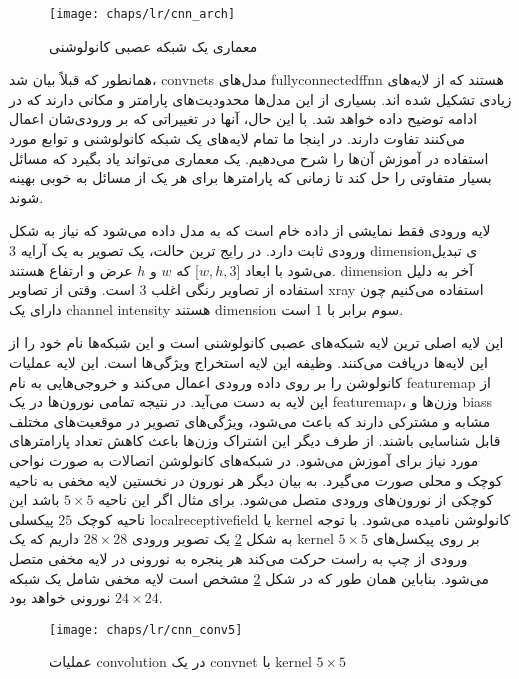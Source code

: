 \begin{figure}[!ht]
	\centerline{\texttt{[image: chaps/lr/cnn\_arch]}}
	\caption{معماری یک شبکه عصبی کانولوشنی}
	\label{fig:ch_lr:cnn_arch}
\end{figure}

همانطور که قبلاً بیان شد، \glspl{convnet} مدل‌های \gls{fullyconnectedffnn} هستند که از لایه‌های زیادی تشکیل شده اند. بسیاری از این مدل‌ها محدودیت‌های پارامتر و مکانی دارند که در ادامه توضیح داده خواهد شد. با این حال، آنها در تغییراتی که بر ورودی‌شان اعمال می‌کنند تفاوت دارند. در اینجا ما تمام لایه‌های یک شبکه کانولوشنی و توابع مورد استفاده در آموزش آن‌ها را شرح می‌دهیم. یک معماری می‌تواند یاد بگیرد که مسائل بسیار متفاوتی را حل کند تا زمانی که پارامترها برای هر یک از مسائل به خوبی بهینه شوند.

لایه ورودی فقط نمایشی از داده خام است که به مدل داده می‌شود که نیاز به شکل ورودی ثابت دارد. در رایج ترین حالت، یک تصویر به یک آرایه 3 \gls{dimension}ی تبدیل می‌شود با ابعاد [$w, h,3$] که $w$ و $h$ عرض و ارتفاع هستند. \gls{dimension} آخر به دلیل استفاده از تصاویر رنگی  اغلب $3$ است. وقتی از تصاویر \gls{xray} استفاده می‌کنیم چون دارای یک \gls{channel} \gls{intensity} هستند \gls{dimension} سوم برابر با $1$ است.

این لایه اصلی ترین لایه شبکه‌های عصبی کانولوشنی است و این شبکه‌ها نام‌ خود را از این لایه‌ها دریافت می‌کنند. وظیفه این لایه استخراج ویژگی‌ها است. این لایه عملیات کانولوشن را بر روی داده ورودی اعمال می‌کند و خروجی‌هایی به نام \gls{featuremap} از این لایه به دست می‌آید. در نتیجه تمامی نورون‌ها در یک \gls{featuremap}، وزن‌ها و \glspl{bias} مشابه و مشترکی دارند که باعث می‌شود، ویژگی‌های تصویر در موقعیت‌های مختلف قابل شناسایی باشند. از طرف دیگر این اشتراک وزن‌ها باعث کاهش تعداد پارامتر‌های مورد نیاز برای آموزش می‌شود. در شبکه‌های کانولوشن اتصالات به صورت نواحی کوچک و محلی صورت می‌گیرد. به بیان دیگر هر نورون در نخستین لایه مخفی به ناحیه کوچکی از نورون‌های ورودی متصل می‌شود. برای مثال اگر این ناحیه $5\times 5$ باشد این ناحیه کوچک $25$ پیکسلی \gls{localreceptivefield}  یا \gls{kernel} کانولوشن نامیده می‌شود. با توجه به شکل \ref{fig:ch_lr:cnn_conv5} یک تصویر ورودی $28\times 28$ داریم که یک \gls{kernel} $5\times 5$ بر روی پیکسل‌های ورودی از چپ به راست حرکت می‌کند هر پنجره به نورونی در لایه مخفی متصل می‌شود. بناباین همان طور که در شکل \ref{fig:ch_lr:cnn_conv5} مشخص است لایه مخفی شامل یک شبکه $24\times 24$ نورونی خواهد بود.

\begin{figure}[!ht]
	\centerline{\texttt{[image: chaps/lr/cnn\_conv5]}}
	\caption{
		عملیات \gls{convolution} در یک \gls{convnet} با \gls{kernel} $5\times 5$
	}
	\label{fig:ch_lr:cnn_conv5}
\end{figure}

